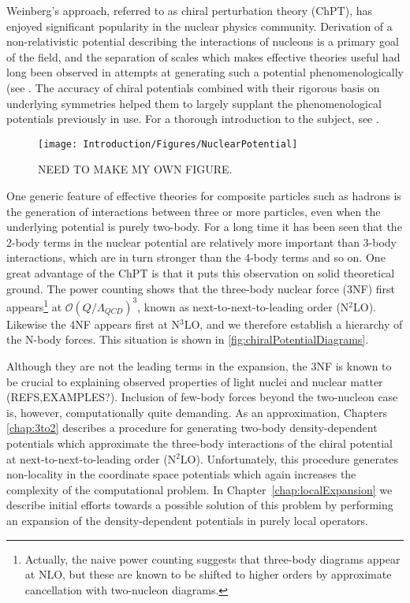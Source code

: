 Weinberg's approach, referred to as chiral perturbation theory (ChPT), has enjoyed significant popularity in the nuclear physics community. Derivation of a non-relativistic potential describing the interactions of nucleons is a primary goal of the field, and the separation of scales which makes effective theories useful had long been observed in attempts at generating such a potential phenomenologically (see . The accuracy of chiral potentials combined with their rigorous basis on underlying symmetries helped them to largely supplant the phenomenological potentials previously in use. For a thorough introduction to the subject, see \cite{Machleidt20111}.

\begin{figure}
\centering
\texttt{[image: Introduction/Figures/NuclearPotential]}
\caption[Test]{\label{fig:NuclearPotential} NEED TO MAKE MY OWN FIGURE.} 
\end{figure}

One generic feature of effective theories for composite particles such as hadrons is the generation of interactions between three or more particles, even when the underlying potential is purely two-body. For a long time it has been seen that the 2-body terms in the nuclear potential are relatively more important than 3-body interactions, which are in turn stronger than the 4-body terms and so on. One great advantage of the ChPT is that it puts this observation on solid theoretical ground. The power counting shows that the three-body nuclear force (3NF) first appears\footnote{Actually, the naive power counting suggests that three-body diagrams appear at NLO, but these are known to be shifted to higher orders by approximate cancellation with two-nucleon diagrams\cite{PhysRevC.49.2932}.} at $\mathcal{O}(Q/\Lambda_{QCD})^3$, known as next-to-next-to-leading order (N$^2$LO). Likewise the 4NF appears first at N$^3$LO, and we therefore establish a hierarchy of the N-body forces. This situation is shown in \cref{fig:chiralPotentialDiagrams}.

Although they are not the leading terms in the expansion, the 3NF is known to be crucial to explaining observed properties of light nuclei and nuclear matter (REFS,EXAMPLES?). Inclusion of few-body forces beyond the two-nucleon case is, however, computationally quite demanding. As an approximation, 
Chapters \ref{chap:3to2} describes a procedure for generating two-body density-dependent potentials which approximate the three-body interactions of the chiral potential at next-to-next-to-leading order (N$^2$LO). Unfortunately, this procedure generates non-locality in the coordinate space potentials which again increases the complexity of the computational problem. In Chapter~\ref{chap:localExpansion} we describe initial efforts towards a possible solution of this problem by performing an expansion of the density-dependent potentials in purely local operators.

